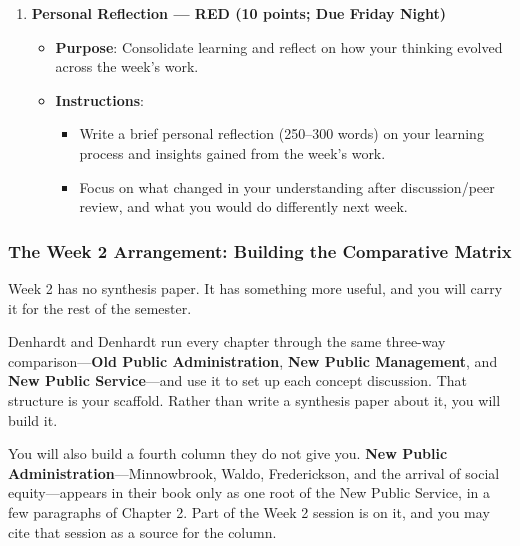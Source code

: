 \documentclass[11pt]{article}     %
\begin{document}
\begin{enumerate}
\begin{itemize}
\begin{itemize}
        \item Include \textbf{all feedback collected} during the week (AI, peer, and/or self-critique) in the appendix, along with a brief \textbf{Next-Week Plan} (5--7 bullets) describing what you will do differently in the next synthesis.
    \end{itemize}
\end{itemize}

    \item \textbf{Personal Reflection --- RED (10 points; Due Friday Night)}
        \begin{itemize}
            \item \textbf{Purpose}: Consolidate learning and reflect on how your thinking evolved across the week's work.
            \item \textbf{Instructions}:
            \begin{itemize}
                \item Write a brief personal reflection (250--300 words) on your learning process and insights gained from the week's work.
                \item Focus on what changed in your understanding after discussion/peer review, and what you would do differently next week.
            \end{itemize}
        \end{itemize}
\end{enumerate}

\subsubsection*{The Week 2 Arrangement: Building the Comparative Matrix}

Week 2 has no synthesis paper. It has something more useful, and you will carry it for the rest of the semester.

Denhardt and Denhardt run every chapter through the same three-way comparison---\textbf{Old Public Administration}, \textbf{New Public Management}, and \textbf{New Public Service}---and use it to set up each concept discussion. That structure is your scaffold. Rather than write a synthesis paper about it, you will build it.

You will also build a fourth column they do not give you. \textbf{New Public Administration}---Minnowbrook, Waldo, Frederickson, and the arrival of social equity---appears in their book only as one root of the New Public Service, in a few paragraphs of Chapter 2. Part of the Week 2 session is on it, and you may cite that session as a source for the column.
\end{document}
